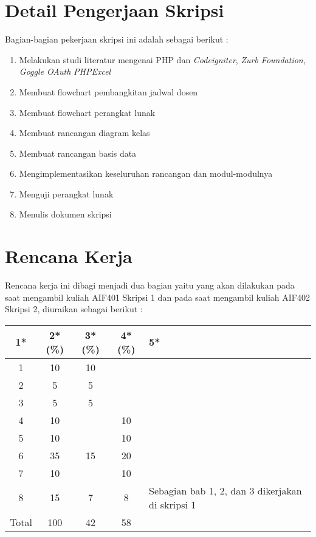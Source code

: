 \documentclass[a4paper,twoside]{article}
\begin{document}
\section{Detail Pengerjaan Skripsi}

Bagian-bagian pekerjaan skripsi ini adalah sebagai berikut :
	\begin{enumerate}
		\item Melakukan studi literatur mengenai PHP dan \textit{Codeigniter}, \textit{Zurb Foundation}, \textit{Goggle OAuth} \textit{PHPExcel}
		\item Membuat flowchart pembangkitan jadwal dosen
		\item Membuat flowchart perangkat lunak
		\item Membuat rancangan diagram kelas
		\item Membuat rancangan basis data
		\item Mengimplementasikan keseluruhan rancangan dan modul-modulnya
		\item Menguji perangkat lunak
		\item Menulis dokumen skripsi
	\end{enumerate}

\section{Rencana Kerja}
Rencana kerja ini dibagi menjadi dua bagian yaitu yang akan dilakukan pada saat mengambil kuliah AIF401 Skripsi 1 dan pada saat mengambil kuliah AIF402 Skripsi 2, diuraikan sebagai berikut :


\begin{center}
  \begin{tabular}{ | c | c | c | c | l |}
    \hline
    1*  & 2*(\%) & 3*(\%) & 4*(\%) &5*\\ \hline \hline
    1   &  10 	&  10 &   & \\ \hline
    2   &  5 	&  5 &   & \\ \hline
	3   &  5 	&  5 &   & {\footnotesize }  \\ \hline
	4   &  10 	&   & 10  & {\footnotesize }  \\ \hline
	5   &  10 	&   & 10  & {\footnotesize }  \\ \hline
	6   &  35  	& 15 & 20  & {\footnotesize }  \\ \hline
	7   &  10 	&   &  10 & {\footnotesize }  \\ \hline
	8   &  15 	& 7 & 8& {\footnotesize Sebagian bab 1, 2, dan 3 dikerjakan di skripsi 1 }  \\ \hline
    Total  & 100  & 42  & 58 &  \\ \hline
                          \end{tabular}
\end{center}
\end{document}
